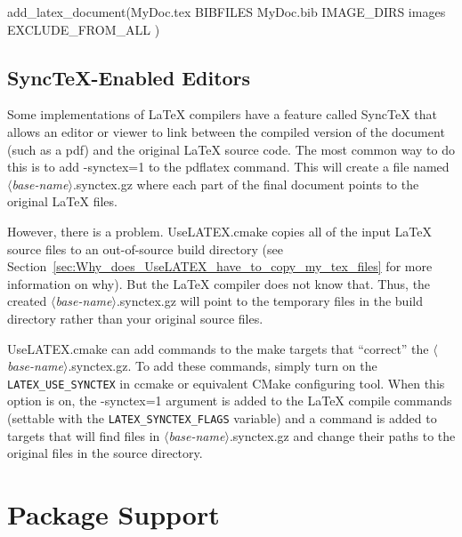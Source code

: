 \documentclass{article}
\newcommand*{\textfile}[1]{\textsf{#1}}
\newcommand*{\textprog}[1]{\textfile{#1}}
\newcommand*{\textcmake}[1]{\texttt{#1}}
\newcommand*{\textcmakevar}[1]{\textcmake{#1}}
\newcommand*{\UseLATEX}{\textfile{UseLATEX.cmake}\xspace}
\newcommand*{\latex}{\LaTeX\xspace}
\renewcommand*{\synctex}{SyncTeX\xspace}
\newcommand*{\synctex}{SyncTeX\xspace}
\begin{document}
  \begin{CodeListing}
add_latex_document(MyDoc.tex
  BIBFILES MyDoc.bib
  IMAGE_DIRS images
  EXCLUDE_FROM_ALL
  )
  \end{CodeListing}

  \subsection{\synctex-Enabled Editors}
  \label{sec:SynctexEnabledEditors}

  Some implementations of \latex compilers have a feature called \synctex
  that allows an editor or viewer to link between the compiled version of
  the document (such as a pdf) and the original \latex source code.  The
  most common way to do this is to add \textprog{-synctex=1} to the
  \textprog{pdflatex} command.  This will create a file named
  \textfile{\emph{$\langle$base-name$\rangle$}.synctex.gz} where each part
  of the final document points to the original \latex files.

  However, there is a problem.  \UseLATEX copies all of the input \latex
  source files to an out-of-source build directory (see
  Section~\ref{sec:Why_does_UseLATEX_have_to_copy_my_tex_files} for more
  information on why).  But the \latex compiler does not know that.  Thus,
  the created \textfile{\emph{$\langle$base-name$\rangle$}.synctex.gz} will
  point to the temporary files in the build directory rather than your
  original source files.

  \UseLATEX can add commands to the make targets that ``correct'' the
  \textfile{\emph{$\langle$base-name$\rangle$}.synctex.gz}.  To add these
  commands, simply turn on the \textcmakevar{LATEX\_USE\_SYNCTEX} in
  \textprog{ccmake} or equivalent CMake configuring tool.  When this option
  is on, the \textprog{-synctex=1} argument is added to the \latex compile
  commands (settable with the \textcmakevar{LATEX\_SYNCTEX\_FLAGS}
  variable) and a command is added to targets that will find files in
  \textfile{\emph{$\langle$base-name$\rangle$}.synctex.gz} and change their
  paths to the original files in the source directory.


  \section{Package Support}
  \label{sec:PackageSupport}
\end{document}
